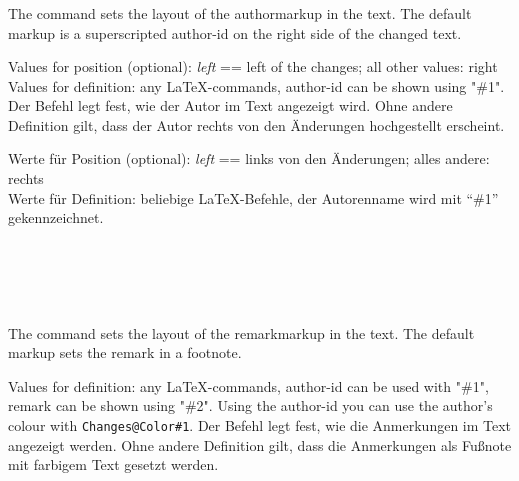 \subsubsection{}
\DescribeMacro{\setauthormarkup}
\ifENGLISH
	The command  sets the layout of the authormarkup in the text.
	The default markup is a superscripted author-id on the right side of the changed text.

	Values for position (optional): \emph{left} == left of the changes; all other values: right\\
	Values for definition: any \LaTeX-commands, author-id can be shown using "\#1".
\fi
	\ifGERMAN
		Der Befehl  legt fest, wie der Autor im Text angezeigt wird.
		Ohne andere Definition gilt, dass der Autor rechts von den Änderungen hochgestellt erscheint.

		Werte für Position (optional): \emph{left} == links von den Änderungen; alles andere: rechts\\
		Werte für Definition: beliebige \LaTeX-Befehle, der Autorenname wird mit "`\#1"' gekennzeichnet.
	\fi
\begin{einspiel}
	\>
\end{einspiel}
\begin{einspiel}[true]
	\>\\
	\>\\
	\>\\
	\>
\end{einspiel}

\subsubsection{}
\DescribeMacro{\setremarkmarkup}
\ifENGLISH
	The command  sets the layout of the remarkmarkup in the text.
	The default markup sets the remark in a footnote.

	Values for definition: any \LaTeX-commands, author-id can be used with "\#1", remark can be shown using "\#2".
	Using the author-id you can use the author's colour with \texttt{Changes@Color\#1}.
\fi
	\ifGERMAN
		Der Befehl  legt fest, wie die Anmerkungen im Text angezeigt werden.
		Ohne andere Definition gilt, dass die Anmerkungen als Fußnote mit farbigem Text gesetzt werden.

